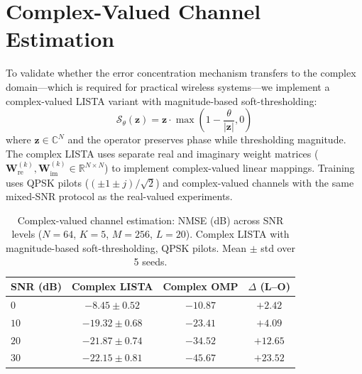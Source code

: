 \documentclass[a4paper,fleqn]{cas-sc}
\begin{document}
\printcredits


\appendix
\clearpage
\section{Complex-Valued Channel Estimation}\label{sec:complex}

To validate whether the error concentration mechanism transfers to the complex domain---which is required for practical wireless systems---we implement a complex-valued LISTA variant with magnitude-based soft-thresholding:
\begin{equation}\label{eq:complex_threshold}
\mathcal{S}_\theta(\mathbf{z}) = \mathbf{z} \cdot \max\left(1 - \frac{\theta}{|\mathbf{z}|}, 0\right)
\end{equation}
where $\mathbf{z} \in \mathbb{C}^N$ and the operator preserves phase while thresholding magnitude. The complex LISTA uses separate real and imaginary weight matrices ($\mathbf{W}^{(k)}_{\text{re}}, \mathbf{W}^{(k)}_{\text{im}} \in \mathbb{R}^{N \times N}$) to implement complex-valued linear mappings. Training uses QPSK pilots ($(\pm 1 \pm j)/\sqrt{2}$) and complex-valued channels with the same mixed-SNR protocol as the real-valued experiments.

\begin{table}[width=.85\linewidth,cols=4,pos=!htbp]
\caption{Complex-valued channel estimation: NMSE (dB) across SNR levels ($N=64$, $K=5$, $M=256$, $L=20$). Complex LISTA with magnitude-based soft-thresholding, QPSK pilots. Mean $\pm$ std over 5 seeds.}\label{tab:complex_nmse}
\begin{tabular*}{\tblwidth}{@{} LCCC@{}}
\toprule
SNR (dB) & Complex LISTA & Complex OMP & $\Delta$ (L--O) \\
\midrule
$0$   & $-8.45 \pm 0.52$  & $\bm{-10.87}$ & $+2.42$ \\
$10$  & $-19.32 \pm 0.68$ & $\bm{-23.41}$ & $+4.09$ \\
$20$  & $-21.87 \pm 0.74$ & $\bm{-34.52}$ & $+12.65$ \\
$30$  & $-22.15 \pm 0.81$ & $\bm{-45.67}$ & $+23.52$ \\
\bottomrule
\end{tabular*}
\end{table}
\end{document}

